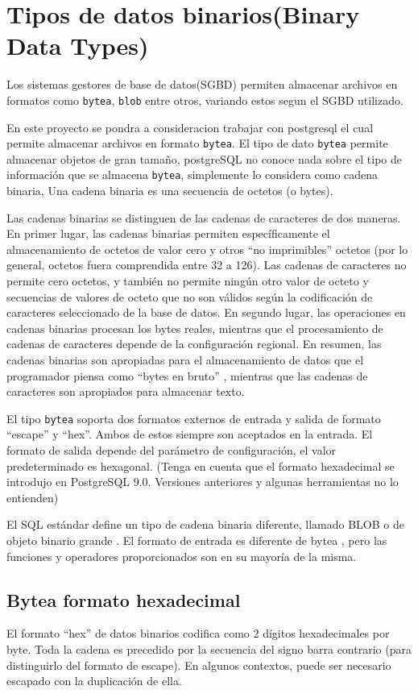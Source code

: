 \section{Tipos de datos binarios(Binary Data Types)}

Los sistemas gestores de base de datos(SGBD) permiten almacenar archivos en formatos como \texttt{bytea}, \texttt{blob} entre otros, variando estos segun el SGBD utilizado. 

En este proyecto se pondra a consideracion trabajar con postgresql el cual permite almacenar archivos en formato \texttt{bytea}. El tipo de dato \texttt{bytea} permite almacenar objetos de gran tama\~no, postgreSQL no conoce nada sobre el tipo de informaci\'on que se almacena \texttt{bytea}, simplemente lo considera como cadena binaria, Una cadena binaria es una secuencia de octetos (o bytes). 

Las cadenas binarias se distinguen de las cadenas de caracteres de dos maneras. En primer lugar, las cadenas binarias permiten espec\'ificamente el almacenamiento de octetos de valor cero y otros ``no imprimibles''  octetos (por lo general, octetos fuera comprendida entre 32 a 126). Las cadenas de caracteres no permite cero octetos, y tambi\'en no permite ning\'un otro valor de octeto y secuencias de valores de octeto que no son v\'alidos seg\'un la codificaci\'on  de caracteres seleccionado de la base de datos. En segundo lugar, las operaciones en cadenas binarias procesan los bytes reales, mientras que el procesamiento de cadenas de caracteres depende de la configuraci\'on regional. En resumen, las cadenas binarias son apropiadas para el almacenamiento de datos que el programador piensa como ``bytes en bruto'' , mientras que las cadenas de caracteres son apropiados para almacenar texto.

El tipo \texttt{bytea} soporta dos formatos externos de entrada y salida de formato ``escape'' y ``hex''. Ambos de estos siempre son aceptados en la entrada. El formato de salida depende del par\'ametro de configuraci\'on, el valor predeterminado es hexagonal. (Tenga en cuenta que el formato hexadecimal se introdujo en PostgreSQL 9.0. Versiones anteriores y algunas herramientas no lo entienden)

El SQL est\'andar define un tipo de cadena binaria diferente, llamado BLOB o de objeto binario grande . El formato de entrada es diferente de bytea , pero las funciones y operadores proporcionados son en su mayoría de la misma.
\subsection{Bytea formato hexadecimal}
El formato ``hex'' de datos binarios codifica como 2 d\'igitos hexadecimales por byte. Toda la cadena es precedido por la secuencia del signo barra contrario (para distinguirlo del formato de escape). En algunos contextos, puede ser necesario escapado con la duplicaci\'on de ella.
